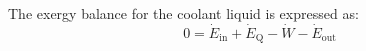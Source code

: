 The exergy balance for the coolant liquid is expressed as:  
\[
0 = \dot{E}_{\text{in}} + \dot{E}_{\text{Q}} - \dot{W} - \dot{E}_{\text{out}}
\]